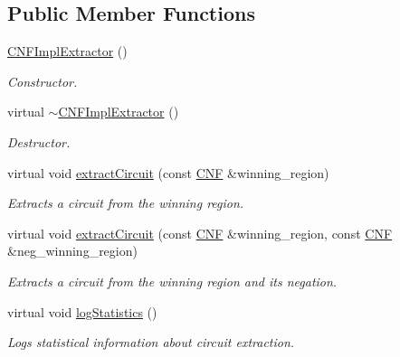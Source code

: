 \subsection*{Public Member Functions}
\begin{DoxyCompactItemize}
\item 
\hyperlink{classCNFImplExtractor_a85fadc5cccc76524d9317041c1be1744}{C\-N\-F\-Impl\-Extractor} ()
\begin{DoxyCompactList}\small\item\em Constructor. \end{DoxyCompactList}\item 
virtual \hyperlink{classCNFImplExtractor_a5c2daeeda948fce2f2d9b361d8b06416}{$\sim$\-C\-N\-F\-Impl\-Extractor} ()
\begin{DoxyCompactList}\small\item\em Destructor. \end{DoxyCompactList}\item 
virtual void \hyperlink{classCNFImplExtractor_ad329eedd50e443f44edc99db8c2e2613}{extract\-Circuit} (const \hyperlink{classCNF}{C\-N\-F} \&winning\-\_\-region)
\begin{DoxyCompactList}\small\item\em Extracts a circuit from the winning region. \end{DoxyCompactList}\item 
virtual void \hyperlink{classCNFImplExtractor_a5e9694425af3f1a76d8b21ace3c435d9}{extract\-Circuit} (const \hyperlink{classCNF}{C\-N\-F} \&winning\-\_\-region, const \hyperlink{classCNF}{C\-N\-F} \&neg\-\_\-winning\-\_\-region)
\begin{DoxyCompactList}\small\item\em Extracts a circuit from the winning region and its negation. \end{DoxyCompactList}\item 
virtual void \hyperlink{classCNFImplExtractor_aae098749e201b22294a70f6e0a4a58f0}{log\-Statistics} ()
\begin{DoxyCompactList}\small\item\em Logs statistical information about circuit extraction. \end{DoxyCompactList}\end{DoxyCompactItemize}
